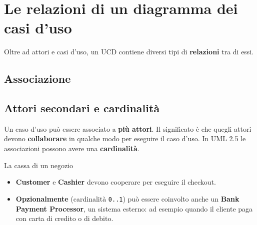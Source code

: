 \section{Le relazioni di un diagramma dei casi d'uso}

Oltre ad attori e casi d'uso, un UCD contiene diversi tipi di \textbf{relazioni} tra di essi.

\subsection{Associazione}


\subsection{Attori secondari e cardinalità}

Un caso d'uso può essere associato a \textbf{più attori}. Il significato è che quegli attori devono \textbf{collaborare}
in qualche modo per eseguire il caso d'uso. In UML 2.5 le associazioni possono avere una \textbf{cardinalità}.

\begin{esempio}{La cassa di un negozio}
\begin{center}
\end{center}
\begin{itemize}
  \item \textbf{Customer} e \textbf{Cashier} devono cooperare per eseguire il checkout.
  \item \textbf{Opzionalmente} (cardinalità \texttt{0..1}) può essere coinvolto anche un \textbf{Bank Payment Processor},
        un sistema esterno: ad esempio quando il cliente paga con carta di credito o di debito.
\end{itemize}
\end{esempio}

